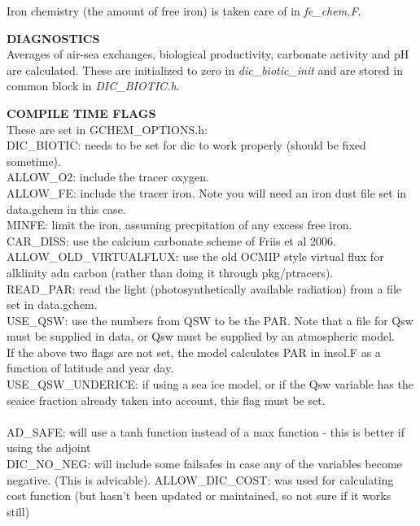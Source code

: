 Iron chemistry (the amount of free iron) is taken care of in
{\it fe\_chem.F}.
 
\vspace{.5cm}

\noindent
{{\bf DIAGNOSTICS}}\\
Averages of air-sea exchanges, biological productivity,
carbonate activity and pH are calculated. These are
initialized to zero in {\it dic\_biotic\_init} and
are stored in common block in {\it DIC\_BIOTIC.h}.

\vspace{.5cm}

\noindent
{{\bf COMPILE TIME FLAGS}}\\
These are set in GCHEM\_OPTIONS.h: \\

DIC\_BIOTIC: needs to be set for dic to work properly
(should be fixed sometime).\\
ALLOW\_O2: include the tracer oxygen.\\
ALLOW\_FE: include the tracer iron. Note you will need an
iron dust file set in data.gchem in this case.\\
MINFE: limit the iron, assuming precpitation of any
excess free iron.\\
CAR\_DISS: use the calcium carbonate scheme of Friis et al 2006.\\
ALLOW\_OLD\_VIRTUALFLUX: use the old OCMIP style virtual flux
for alklinity adn carbon (rather than doing it through pkg/ptracers).
\\
READ\_PAR: read the light (photosynthetically available
radiation) from a file set in data.gchem.\\
USE\_QSW: use the numbers from QSW to be the PAR. Note that
a file for Qsw must be supplied in data, or Qsw must be
supplied by an atmospheric model.\\
If the above two flags are not set, the model calculates
PAR in insol.F as a function of latitude and year day.\\
USE\_QSW\_UNDERICE: if using a sea ice model, or if the
Qsw variable has the seaice fraction already taken into
account, this flag must be set.\\
\\
AD\_SAFE: will use a tanh function instead of a
max function - this is better if using the adjoint\\
DIC\_NO\_NEG: will include some failsafes in case any
of the variables become negative. (This is advicable).
ALLOW\_DIC\_COST: was used for calculating cost function 
(but hasn't been updated or maintained, so not sure if it works still)



